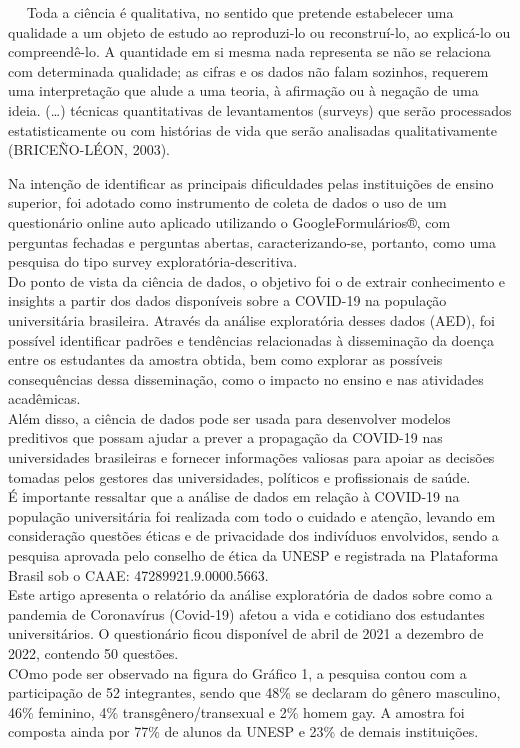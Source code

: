 \documentclass[
]{article}
\begin{document}
  Toda a ciência é qualitativa, no sentido que pretende estabelecer uma
qualidade a um objeto de estudo ao reproduzi-lo ou reconstruí-lo, ao
explicá-lo ou compreendê-lo. A quantidade em si mesma nada representa se
não se relaciona com determinada qualidade; as cifras e os dados não
falam sozinhos, requerem uma interpretação que alude a uma teoria, à
afirmação ou à negação de uma ideia. (\ldots) técnicas quantitativas de
levantamentos (surveys) que serão processados estatisticamente ou com
histórias de vida que serão analisadas qualitativamente (BRICEÑO-LÉON,
2003).

Na intenção de identificar as principais dificuldades pelas instituições
de ensino superior, foi adotado como instrumento de coleta de dados o
uso de um questionário online auto aplicado utilizando o
GoogleFormulários®, com perguntas fechadas e perguntas abertas,
caracterizando-se, portanto, como uma pesquisa do tipo survey
exploratória-descritiva.\\
Do ponto de vista da ciência de dados, o objetivo foi o de extrair
conhecimento e insights a partir dos dados disponíveis sobre a COVID-19
na população universitária brasileira. Através da análise exploratória
desses dados (AED), foi possível identificar padrões e tendências
relacionadas à disseminação da doença entre os estudantes da amostra
obtida, bem como explorar as possíveis consequências dessa disseminação,
como o impacto no ensino e nas atividades acadêmicas.\\
Além disso, a ciência de dados pode ser usada para desenvolver modelos
preditivos que possam ajudar a prever a propagação da COVID-19 nas
universidades brasileiras e fornecer informações valiosas para apoiar as
decisões tomadas pelos gestores das universidades, políticos e
profissionais de saúde.\\
É importante ressaltar que a análise de dados em relação à COVID-19 na
população universitária foi realizada com todo o cuidado e atenção,
levando em consideração questões éticas e de privacidade dos indivíduos
envolvidos, sendo a pesquisa aprovada pelo conselho de ética da UNESP e
registrada na Plataforma Brasil sob o CAAE: 47289921.9.0000.5663.\\
Este artigo apresenta o relatório da análise exploratória de dados sobre
como a pandemia de Coronavírus (Covid-19) afetou a vida e cotidiano dos
estudantes universitários. O questionário ficou disponível de abril de
2021 a dezembro de 2022, contendo 50 questões.\\
COmo pode ser observado na figura do Gráfico 1, a pesquisa contou com a
participação de 52 integrantes, sendo que 48\% se declaram do gênero
masculino, 46\% feminino, 4\% transgênero/transexual e 2\% homem gay. A
amostra foi composta ainda por 77\% de alunos da UNESP e 23\% de demais
instituições.
\end{document}
